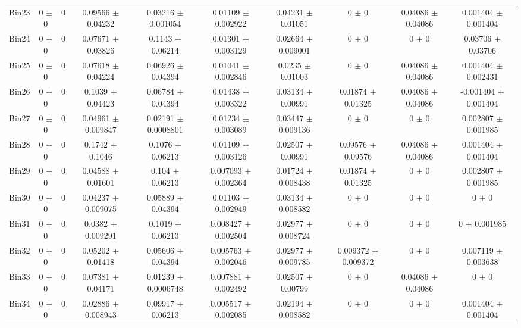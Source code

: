 \begin{tabular}{@{\extracolsep{4pt}}lccccccccc@{}}
     Bin23 & 0 $\pm$ 0 & 0 & 0.09566 $\pm$ 0.04232 & 0.03216 $\pm$ 0.001054 & 0.01109 $\pm$ 0.002922 & 0.04231 $\pm$ 0.01051 & 0 $\pm$ 0 & 0.04086 $\pm$ 0.04086 & 0.001404 $\pm$ 0.001404 \\ 
     Bin24 & 0 $\pm$ 0 & 0 & 0.07671 $\pm$ 0.03826 & 0.1143 $\pm$ 0.06214 & 0.01301 $\pm$ 0.003129 & 0.02664 $\pm$ 0.009001 & 0 $\pm$ 0 & 0 $\pm$ 0 & 0.03706 $\pm$ 0.03706 \\ 
     Bin25 & 0 $\pm$ 0 & 0 & 0.07618 $\pm$ 0.04224 & 0.06926 $\pm$ 0.04394 & 0.01041 $\pm$ 0.002846 & 0.0235 $\pm$ 0.01003 & 0 $\pm$ 0 & 0.04086 $\pm$ 0.04086 & 0.001404 $\pm$ 0.002431 \\ 
     Bin26 & 0 $\pm$ 0 & 0 & 0.1039 $\pm$ 0.04423 & 0.06784 $\pm$ 0.04394 & 0.01438 $\pm$ 0.003322 & 0.03134 $\pm$ 0.00991 & 0.01874 $\pm$ 0.01325 & 0.04086 $\pm$ 0.04086 & -0.001404 $\pm$ 0.001404 \\ 
     Bin27 & 0 $\pm$ 0 & 0 & 0.04961 $\pm$ 0.009847 & 0.02191 $\pm$ 0.0008801 & 0.01234 $\pm$ 0.003089 & 0.03447 $\pm$ 0.009136 & 0 $\pm$ 0 & 0 $\pm$ 0 & 0.002807 $\pm$ 0.001985 \\ 
     Bin28 & 0 $\pm$ 0 & 0 & 0.1742 $\pm$ 0.1046 & 0.1076 $\pm$ 0.06213 & 0.01109 $\pm$ 0.003126 & 0.02507 $\pm$ 0.00991 & 0.09576 $\pm$ 0.09576 & 0.04086 $\pm$ 0.04086 & 0.001404 $\pm$ 0.001404 \\ 
     Bin29 & 0 $\pm$ 0 & 0 & 0.04588 $\pm$ 0.01601 & 0.104 $\pm$ 0.06213 & 0.007093 $\pm$ 0.002364 & 0.01724 $\pm$ 0.008438 & 0.01874 $\pm$ 0.01325 & 0 $\pm$ 0 & 0.002807 $\pm$ 0.001985 \\ 
     Bin30 & 0 $\pm$ 0 & 0 & 0.04237 $\pm$ 0.009075 & 0.05889 $\pm$ 0.04394 & 0.01103 $\pm$ 0.002949 & 0.03134 $\pm$ 0.008582 & 0 $\pm$ 0 & 0 $\pm$ 0 & 0 $\pm$ 0 \\ 
     Bin31 & 0 $\pm$ 0 & 0 & 0.0382 $\pm$ 0.009291 & 0.1019 $\pm$ 0.06213 & 0.008427 $\pm$ 0.002504 & 0.02977 $\pm$ 0.008724 & 0 $\pm$ 0 & 0 $\pm$ 0 & 0 $\pm$ 0.001985 \\ 
     Bin32 & 0 $\pm$ 0 & 0 & 0.05202 $\pm$ 0.01418 & 0.05606 $\pm$ 0.04394 & 0.005763 $\pm$ 0.002046 & 0.02977 $\pm$ 0.009785 & 0.009372 $\pm$ 0.009372 & 0 $\pm$ 0 & 0.007119 $\pm$ 0.003638 \\ 
     Bin33 & 0 $\pm$ 0 & 0 & 0.07381 $\pm$ 0.04171 & 0.01239 $\pm$ 0.0006748 & 0.007881 $\pm$ 0.002492 & 0.02507 $\pm$ 0.00799 & 0 $\pm$ 0 & 0.04086 $\pm$ 0.04086 & 0 $\pm$ 0 \\ 
     Bin34 & 0 $\pm$ 0 & 0 & 0.02886 $\pm$ 0.008943 & 0.09917 $\pm$ 0.06213 & 0.005517 $\pm$ 0.002085 & 0.02194 $\pm$ 0.008582 & 0 $\pm$ 0 & 0 $\pm$ 0 & 0.001404 $\pm$ 0.001404 \\ 

\end{tabular}
